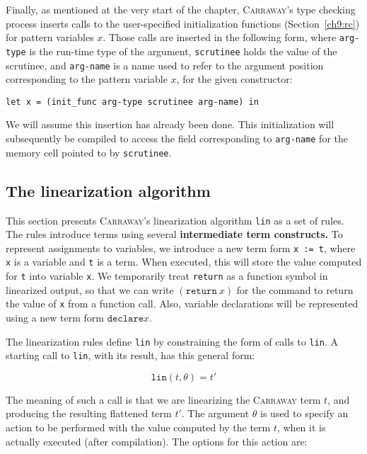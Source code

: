 \documentclass{book}[12pt]
\newcommand{\carraway}[0]{\textsc{Carraway}\xspace}
\begin{document}
Finally, as mentioned at the very start of the chapter, \carraway's
type checking process inserts calls to the user-specified
initialization functions (Section~\ref{ch9:rc}) for pattern variables
$x$.  Those calls are inserted in the following form, where
\texttt{arg-type} is the run-time type of the argument,
\texttt{scrutinee} holds the value of the scrutinee, and
\texttt{arg-name} is a name used to refer to the argument position
corresponding to the pattern variable $x$, for the given constructor:

\begin{verbatim}
let x = (init_func arg-type scrutinee arg-name) in
\end{verbatim}

\noindent We will assume this insertion has already been done.  This
initialization will subsequently be compiled to access the field
corresponding to \texttt{arg-name} for the memory cell pointed to by
\texttt{scrutinee}.

\subsection{The linearization algorithm}

This section presents \carraway's linearization algorithm \texttt{lin}
as a set of rules.  The rules introduce terms using several
\textbf{intermediate term constructs.} To represent assignments to
variables, we introduce a new term form \texttt{x := t}, where
\texttt{x} is a variable and \texttt{t} is a term.  When executed,
this will store the value computed for \texttt{t} into variable
\texttt{x}.  We temporarily treat \texttt{return} as a function symbol
in linearized output, so that we can write $(\texttt{return}\ x)$ for
the command to return the value of \texttt{x} from a function call.
Also, variable declarations will be represented using a new term form
$\texttt{declare} x$.  

The linearization rules define \texttt{lin} by constraining the form
of calls to \texttt{lin}.  A starting call to \texttt{lin}, with its
result, has this general form:


\[ \texttt{lin}(t,\theta) = t' \]

\noindent The meaning of such a call is that we are linearizing the
\carraway term $t$, and producing the resulting flattened term $t'$.
The argument $\theta$ is used to specify an action to be performed
with the value computed by the term $t$, when it is actually executed
(after compilation).  The options for this action are:
\end{document}
